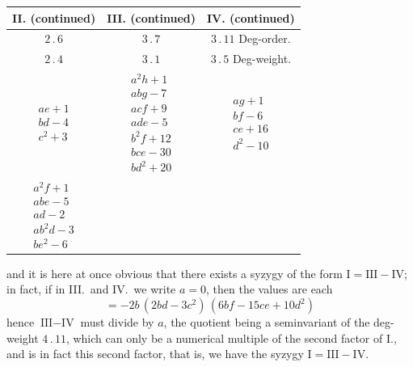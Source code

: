 \documentclass[11pt]{article}
\begin{document}
\bigskip

\noindent
\begin{center}
\begin{tabular}{|c|c|c|}
\hline
\textsc{II}. (continued) & \textsc{III}. (continued) & \textsc{IV}. (continued)\\
\hline
$2\,.\,6$ & $3\,.\,7$ & $3\,.\,11$ \quad Deg-order.\\
$2\,.\,4$ & $3\,.\,1$ & $3\,.\,5$ \quad Deg-weight.\\
\hline
$\begin{array}{l} ae + 1\\ bd - 4\\ c^{2} + 3\end{array}$ &
$\begin{array}{l} a^{2} h + 1\\ abg - 7\\ acf + 9\\ ade - 5\\ b^{2} f + 12\\ bce - 30\\ bd^{2} + 20\end{array}$ &
$\begin{array}{l} ag + 1\\ bf - 6\\ ce + 16\\ d^{2} - 10\end{array}$\\
\hline
$\begin{array}{l} a^{2} f + 1\\ abe - 5\\ ad - 2\\ ab^{2} d - 3\\ be^{2} - 6\end{array}$ & & \\
\hline
\end{tabular}
\end{center}

\medskip
and it is here at once obvious that there exists a syzygy of the form $\text{I} = \text{III} - \text{IV}$;
in fact, if in \textsc{III}.\ and \textsc{IV}.\ we write $a = 0$, then the values are each
\[
  = -2b\,(2 b d - 3 c^{2})\,(6 b f - 15 c e + 10 d^{2})
\]
hence $\text{III} - \text{IV}$ must divide by $a$, the quotient being a seminvariant of the deg-weight
$4\,.\,11$, which can only be a numerical multiple of the second factor of \textsc{I}., and is in
fact this second factor, that is, we have the syzygy $\text{I} = \text{III} - \text{IV}$.
\end{document}
